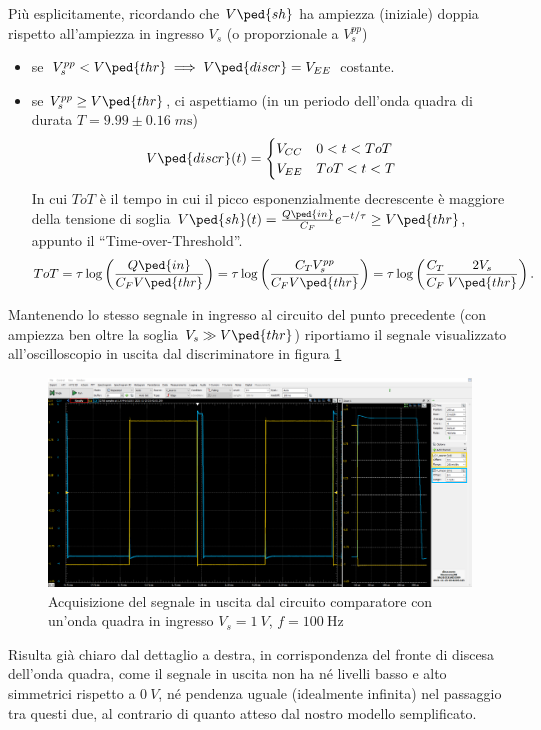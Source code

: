 \documentclass[10pt,a4paper]{article}
\begin{document}
Più esplicitamente, ricordando che $V\ped{sh}$ ha ampiezza (iniziale) doppia
rispetto all'ampiezza in ingresso $V_s$ (o proporzionale a $V_s^{pp}$)
\begin{itemize}
\item se $V_s^{pp} < V\ped{thr} \implies V\ped{discr} = V_{EE}$ costante.
\item se $V_s^{pp} \geq V\ped{thr}$, ci aspettiamo (in un periodo dell'onda
quadra di durata $T = 9.99 \pm 0.16 \; \si{m\s}$)
\[
V\ped{discr}(t) =
\begin{cases}
V_{CC} & 0 < t < ToT \\
V_{EE} & ToT < t < T
\end{cases}
\]
In cui $ToT$ è il tempo in cui il picco esponenzialmente decrescente è
maggiore della tensione di soglia
$V\ped{sh}(t) = \frac{Q\ped{in}}{C_F} e^{-t/\tau} \geq V\ped{thr}$, appunto il
``Time-over-Threshold''.
\begin{equation} \label{eq:ToT}
ToT = \tau \log\left(\frac{Q\ped{in}}{C_F V\ped{thr}}\right) =
\tau \log\left(\frac{C_T V_s^{pp}}{C_F V\ped{thr}}\right) = 
\tau \log\left(\frac{C_T}{C_F} \frac{2 V_s}{V\ped{thr}}\right).
  \end{equation}
\end{itemize}

Mantenendo lo stesso segnale in ingresso al circuito del punto precedente
(con ampiezza ben oltre la soglia $V_s \gg V\ped{thr}$) riportiamo il
segnale visualizzato all'oscilloscopio in uscita dal discriminatore in figura
\ref{fig: discr}
\begin{figure}[htbp]
\centering
\includegraphics[scale=0.335]{discrzoom}
\caption{Acquisizione del segnale in uscita dal circuito comparatore con
un'onda quadra in ingresso $V_s = \SI{1}{V}$, $f = \SI{100}{\Hz}$
\label{fig: discr}}
\end{figure}
Risulta già chiaro dal dettaglio a destra, in corrispondenza del fronte di
discesa dell'onda quadra, come il segnale in uscita non ha né livelli basso
e alto simmetrici rispetto a $\SI{0}{V}$, né pendenza uguale (idealmente
infinita) nel passaggio tra questi due, al contrario di quanto atteso dal
nostro modello semplificato.
\end{document}
